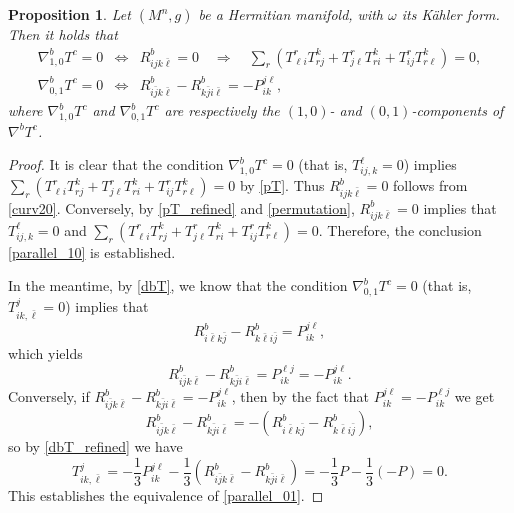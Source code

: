 \documentclass{amsart}
\numberwithin{equation}{section}
\newtheorem{proposition}[theorem]{Proposition}
\theoremstyle{definition}
\renewcommand{\1}{\mathds{1}}
\renewcommand{\>}{\rightarrow}
\begin{document}
\begin{proposition}\label{Tderivative}
Let $(M^n,g)$ be a Hermitian manifold, with $\omega$ its K\"ahler form.
Then it holds that
\begin{eqnarray}
\nabla^b_{1,0} T^c=0 & \Longleftrightarrow &
R^b_{ijk\bar{\ell}}=0\quad \Longrightarrow \quad \sum_r(T^r_{\ell i}T^k_{r j} + T^r_{j\ell}T^k_{ri} + T^r_{ij}T^k_{r \ell})=0,\label{parallel_10}\\
\nabla^b_{0,1} T^c=0 & \Longleftrightarrow &
R^b_{i \bar{j} k \bar{\ell}} - R^b_{k \bar{j} i \bar{\ell}} = -P_{ik}^{j \ell} \label{parallel_01},
\end{eqnarray}
where $\nabla^b_{1,0} T^c$ and $\nabla^b_{0,1} T^c$ are respectively the $(1,0)$- and $(0,1)$-components of $\nabla^bT^c$.
\end{proposition}

\begin{proof}
It is clear that the condition $\nabla^b_{1,0}T^c=0$ (that is, $T_{ij,k}^\ell=0$) implies $\sum_r(T^r_{\ell i}T^k_{r j} + T^r_{j\ell}T^k_{ri} + T^r_{ij}T^k_{r \ell})=0$ by \eqref{pT}.
Thus $R^b_{ijk\bar{\ell}}=0$ follows from \eqref{curv20}. Conversely, by \eqref{pT_refined} and \eqref{permutation}, $R^b_{ijk\bar{\ell}}=0$ implies that $T_{ij,k}^\ell=0$ and $\sum_r(T^r_{\ell i}T^k_{r j} + T^r_{j\ell}T^k_{ri} + T^r_{ij}T^k_{r \ell})=0$.
Therefore, the conclusion \eqref{parallel_10} is established.

In the meantime, by \eqref{dbT}, we know that the condition $\nabla^b_{0,1}T^c=0$ (that is, $T_{ik,\bar{\ell}}^j=0$) implies that
\[ R^b_{i \bar{\ell} k \bar{j}} - R^b_{k \bar{\ell} i \bar{j}} =P_{ik}^{j\ell}, \]
which yields
\[ R^b_{i \bar{j} k \bar{\ell}} - R^b_{k \bar{j} i \bar{\ell}} =P_{ik}^{\ell j}=-P_{ik}^{j \ell}.\]
Conversely, if $R^b_{i \bar{j} k \bar{\ell}} - R^b_{k \bar{j} i \bar{\ell}} =-P_{ik}^{j \ell}$, then by the fact that $P_{ik}^{j\ell}=-P_{ik}^{\ell j}$ we get
\[R^b_{i \bar{j} k \bar{\ell}} - R^b_{k \bar{j} i \bar{\ell}} = -(R^b_{i \bar{\ell} k \bar{j}} - R^b_{k \bar{\ell} i \bar{j}}),\]
so by \eqref{dbT_refined} we have
\[T_{ik,\bar{\ell}}^j = -\frac{1}{3}P_{ik}^{j \ell} - \frac{1}{3} (R^b_{i \bar{j} k \bar{\ell}} - R^b_{k \bar{j} i \bar{\ell}}) = -\frac{1}{3}P - \frac{1}{3}(-P) = 0.\]
This establishes the equivalence of \eqref{parallel_01}.
\end{proof}
\end{document}
